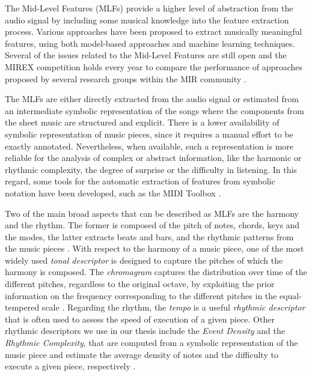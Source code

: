 The Mid-Level Features (MLFs) provide a higher level of abstraction from the audio signal by including some musical knowledge into the feature extraction process. Various approaches have been proposed to extract musically meaningful features, using both model-based approaches and machine learning techniques. Several of the issues related to the Mid-Level Features are still open and the MIREX competition holds every year to compare the performance of approaches proposed by several research groups within the MIR community \cite{downie2014ten}.

The MLFs are either directly extracted from the audio signal or estimated from an intermediate symbolic representation of the songs where the components from the sheet music are structured and explicit. There is a lower availability of symbolic representation of music pieces, since it requires a manual effort to be exactly annotated. Nevertheless, when available, such a representation 
is more reliable for the analysis of complex or abstract information, like the harmonic or rhythmic complexity, the degree of surprise or the difficulty in listening. In this regard, some tools for the automatic extraction of features from symbolic notation have been developed, such as the MIDI Toolbox \cite{Eerola2004}.

Two of the main broad aspects that can be described as MLFs are the harmony and the rhythm. The former is composed of the pitch of notes, chords, keys and the modes, the latter extracts beats and bars, and the rhythmic patterns from the music pieces \cite{muller2007information,muller2015fundamentals,bello2010identifying,Nieto2D}. With respect to the harmony of a music piece, one of the most widely used \textit{tonal descriptor} is designed to capture the pitches of which the harmony is composed. The \textit{chromagram} captures the distribution over time of the different pitches, regardless to the original octave, by exploiting the prior information on the frequency corresponding to the different pitches in the equal-tempered scale \cite{weihs2016music}. Regarding the rhythm, the \textit{tempo} is a useful \textit{rhythmic descriptor} that is often used to assess the speed of execution of a given piece. Other rhythmic descriptors we use in our thesis include the \textit{Event Density} and the \textit{Rhythmic Complexity}, that are computed from a symbolic representation of the music piece and estimate the average density of notes and the difficulty to execute a given piece, respectively \cite{Eerola2004}.

